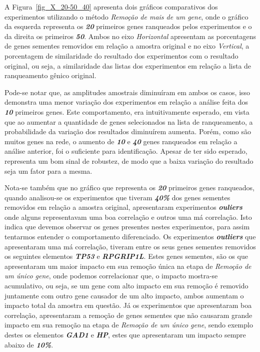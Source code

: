 %
A Figura~\ref{fig_X_20-50_40} apresenta dois gráficos comparativos dos experimentos utilizando o método \textsl{Remoção de mais de um gene}, onde o gráfico da esquerda representa os \textsl{\textbf{20}} primeiros genes ranqueados pelos experimentos e o da direita os primeiros \textsl{\textbf{50}}. Ambos no eixo \textsl{Horizontal} apresentam as porcentagens de genes sementes removidos em relação a amostra original e no eixo \textsl{Vertical}, a porcentagem de similaridade do resultado dos experimentos com o resultado original, ou seja, a similaridade das listas dos experimentos em relação a lista de ranqueamento gênico original.
%

Pode-se notar que, as amplitudes amostrais diminuíram em ambos os casos, isso demonstra uma menor variação dos experimentos em relação a análise feita dos \textsl{\textbf{10}} primeiros genes. Este comportamento, era intuitivamente esperado, em vista que ao aumentar a quantidade de genes selecionados na lista de ranqueamento, a probabilidade da variação dos resultados diminuírem aumenta. Porém, como são muitos genes na rede, o aumento de \textsl{\textbf{10}} e \textsl{\textbf{40}} genes ranqueados em relação a análise anterior, foi o suficiente para identificação. Apesar de ter sido esperado, representa um bom sinal de robustez, de modo que a baixa variação do resultado seja um fator para a mesma.
%

Nota-se também que no gráfico que representa os \textsl{\textbf{20}} primeiros genes ranqueados, quando analisou-se os experimentos que tiveram \textsl{\textbf{40\%}} dos genes sementes removidos em relação a amostra original, apresentaram experimentos \textsl{\textbf{ouliers}} onde alguns representavam uma boa correlação e outros uma má correlação. Isto indica que devemos observar os genes presentes nestes experimentos, para assim tentarmos entender o comportamento diferenciado. Os experimentos \textsl{\textbf{outliers}} que apresentaram uma má correlação, tiveram entre os seus genes sementes removidos os seguintes elementos \textsl{\textbf{TP53}} e \textsl{\textbf{RPGRIP1L}}. Estes genes sementes, são os que apresentaram um maior impacto em sua remoção única na etapa de \textsl{Remoção de um único gene}, onde podemos correlacionar que, o impacto mostra-se acumulativo, ou seja, se um gene com alto impacto em sua remoção é removido juntamente com outro gene causador de um alto impacto, ambos aumentam o impacto total da amostra em questão. Já os experimentos que apresentaram boa correlação, apresentaram a remoção de genes sementes que não causaram grande impacto em sua remoção na etapa de \textsl{Remoção de um único gene}, sendo exemplo destes os elementos \textsl{\textbf{GAD1}} e \textsl{\textbf{HP}}, estes que apresentaram um impacto sempre abaixo de \textsl{\textbf{10\%}}.   
%

